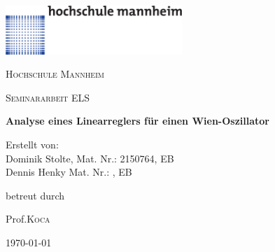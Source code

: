 \begin{titlepage}

  \includegraphics[width=0.5\textwidth]{../common/hsma-logo.pdf}\par\vspace{1cm}
  \centering
	{\scshape\LARGE Hochschule Mannheim \par}
	\vspace{1cm}
	{\scshape\Large Seminararbeit ELS\par}
	\vspace{1.5cm}
	{\huge\bfseries Analyse eines Linearreglers für einen Wien-Oszillator\par}
	\vspace{2cm}
	{\Large Erstellt von:\\Dominik Stolte, Mat. Nr.: 2150764, EB\\ Dennis Henky Mat. Nr.: , EB\par}
	\vfill
	betreut durch\par
	Prof.\textsc{Koca}
	\vfill
	{\large \today\par}
\end{titlepage}